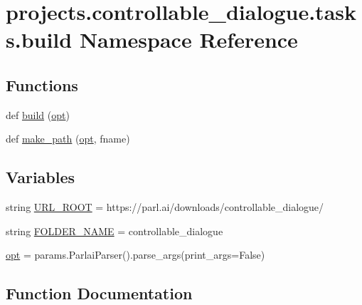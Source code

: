 \hypertarget{namespaceprojects_1_1controllable__dialogue_1_1tasks_1_1build}{}\section{projects.\+controllable\+\_\+dialogue.\+tasks.\+build Namespace Reference}
\label{namespaceprojects_1_1controllable__dialogue_1_1tasks_1_1build}
\subsection*{Functions}
\begin{DoxyCompactItemize}
\item 
def \hyperlink{namespaceprojects_1_1controllable__dialogue_1_1tasks_1_1build_a81362ba81ea151eaa905d59ec129291f}{build} (\hyperlink{namespaceprojects_1_1controllable__dialogue_1_1tasks_1_1build_aff2d50a83bc83a9f5f82bca82737fec2}{opt})
\item 
def \hyperlink{namespaceprojects_1_1controllable__dialogue_1_1tasks_1_1build_a4ad8db760a5f21fd2efa3e09b47a0ec9}{make\+\_\+path} (\hyperlink{namespaceprojects_1_1controllable__dialogue_1_1tasks_1_1build_aff2d50a83bc83a9f5f82bca82737fec2}{opt}, fname)
\end{DoxyCompactItemize}
\subsection*{Variables}
\begin{DoxyCompactItemize}
\item 
string \hyperlink{namespaceprojects_1_1controllable__dialogue_1_1tasks_1_1build_afbbe9c5b36d819aa16ac6ec2ec3f5cad}{U\+R\+L\+\_\+\+R\+O\+OT} = \textquotesingle{}https\+://parl.\+ai/downloads/controllable\+\_\+dialogue/\textquotesingle{}
\item 
string \hyperlink{namespaceprojects_1_1controllable__dialogue_1_1tasks_1_1build_a6142c79abe14ec50c04cf956b0349078}{F\+O\+L\+D\+E\+R\+\_\+\+N\+A\+ME} = \textquotesingle{}controllable\+\_\+dialogue\textquotesingle{}
\item 
\hyperlink{namespaceprojects_1_1controllable__dialogue_1_1tasks_1_1build_aff2d50a83bc83a9f5f82bca82737fec2}{opt} = params.\+Parlai\+Parser().parse\+\_\+args(print\+\_\+args=False)
\end{DoxyCompactItemize}


\subsection{Function Documentation}
\mbox{\label{namespaceprojects_1_1controllable__dialogue_1_1tasks_1_1build_a81362ba81ea151eaa905d59ec129291f}} 
